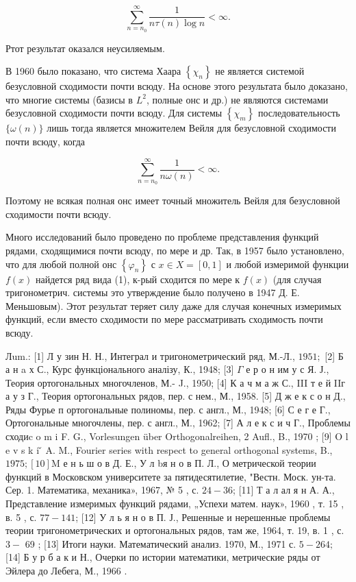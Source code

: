 \documentclass[10pt]{article}
\begin{document}
\[

\sum_{n=n_{0}}^{\infty} \frac{1}{n \tau(n) \log n}<\infty .

\]



Ртот результат оказался неусиляемым.



В 1960 было показано, что система Хаара $\left\{\chi_{n}\right\}$ не является системой безусловной сходимости почти всюду. На основе этого результата было доказано, что многие системы (базисы в $L^{2}$, полные онс и др.) не являются системами безусловной сходимости почти всюду. Для системы $\left\{\chi_{m}\right\}$ последовательность $\{\omega(n)\}$ лишь тогда является множителем Вейля для безусловной сходимости почти всюду, когда



\[

\sum_{n=n_{0}}^{\infty} \frac{1}{n \omega(n)}<\infty .

\]



Поэтому не всякая полная онс имеет точный множитель Вейля для безусловной сходимости почти всюду.



Много исследований было проведено по проблеме представления функций рядами, сходящимися почти всюду, по мере и др. Так, в 1957 было установлено, что для любой полной онс $\left\{\varphi_{n}\right\}$ с $x \in X=[0,1]$ и любой измеримой функции $f(x)$ найдется ряд вида (1), к-рый сходится по мере к $f(x)$ (для случая тригонометрич. системы это утверждение было получено в 1947 Д. Е. Меньшовым). Этот результат теряет силу даже для случая конечных измеримых функций, если вместо сходимости по мере рассматривать сходимость почти всюду.



Лum.: [1] Л у зин Н. Н., Интеграл и тригонометрический ряд, М.-Л., $1951 ;$ [2] Б а н a х С., Курс функціонального аналізу, К., 1948; [3] $\Gamma$ е р о н им у с Я. Ј., Теория ортогональных многочленов, М.- J., 1950; [4] К а ч м а ж С., III т е й IIг а у з Г., Теория ортогональных рядов, пер. с нем., М., 1958. [5] Д ж е к с о н Д., Ряды Фурье п ортогональные полиномы, пер. с англ., М., 1948; [6] С е г е Г., Ортогональные многочлены, пер. с англ., М., 1962; [7] А л е к с и ч Г., Проблемы сходиc o m i F. G., Vorlesungen über Orthogonalreihen, 2 Aufl., B., 1970 ; [9] O l e v s k i ̌ A. M., Fourier series with respect to general orthogonal systems, B., $1975 ;[10] \mathrm{M}$ е н ь ш о в Д. Е., У л bя н о в П. Л., О метрической теории функций в Московском университете за пятидесятилетие, "Вестн. Моск. ун-та. Сер. 1. Математика, механика», 1967, № 5 , с. $24-36$; [11] Т а л ал я н А. А., Представление измеримых функций рядами, „Успехи матем. наук», 1960 , т. 15 , в. 5 , с. $77-141$; [12] У л ь я н о в П. Ј., Решенные и нерешенные проблемы теории тригонометрических и ортогональных рядов, там же, 1964, т. 19, в. 1 , с. $3-$ 69 ; [13] Итоги науки. Математический анализ. 1970, М., 1971 с. $5-264 ;$ [14] Б у р б а к и Н., Очерки по истории математики, метрические ряды от Эйлера до Лебега, М., 1966 .
\end{document}
